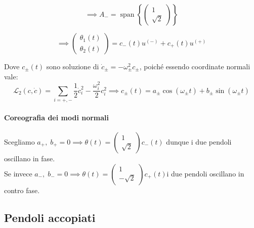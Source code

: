 \begin{equation}
\implies A_- = \operatorname{span}\left\{ \begin{pmatrix} 1 \\ \sqrt{2} \end{pmatrix} \right\}
\end{equation}

\begin{equation}
    \implies \begin{pmatrix}
        \theta_1(t)\\\theta_2   (t)
    \end{pmatrix} = c_-(t)u^{(-)}+c_+(t)u^{(+)}
\end{equation}

Dove $c_{\pm}(t)$ sono soluzione di $\dot{c}_\pm= - \omega_\pm^2c_\pm$, poiché essendo coordinate normali vale:
\begin{equation*}
    \mathcal{L}_2(c,\dot{c})= \sum_{i = +,-}\frac{1}{2}\dot{c}_i^2- \frac{\omega_i^2}{2}c_i^2\implies
    c_\pm(t)=a_\pm\cos(\omega_\pm t)+b_\pm\sin(\omega_\pm t)
\end{equation*}

\paragraph{Coreografia dei modi normali}
Scegliamo $a_+,\;b_+=0\implies \theta(t)= \begin{pmatrix}
    1\\ \sqrt{2}    
\end{pmatrix}c_-(t)$ dunque i due pendoli oscillano in fase.\\
Se invece  $a_-,\;b_-=0\implies \theta(t)= \begin{pmatrix}
    1\\ -\sqrt{2}    
\end{pmatrix}c_+(t)$i due pendoli oscillano in contro fase.


\subsection{Pendoli accopiati}


